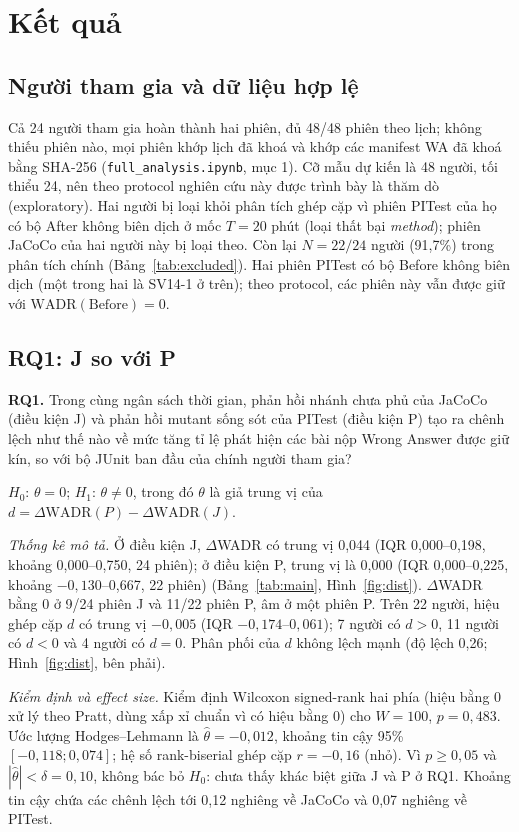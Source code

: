 \section{Kết quả}
\label{sec:results}

\subsection{Người tham gia và dữ liệu hợp lệ}
Cả 24 người tham gia hoàn thành hai phiên, đủ 48/48 phiên theo lịch; không thiếu phiên nào, mọi phiên khớp lịch đã khoá và khớp các manifest WA đã khoá bằng SHA-256 (\texttt{full\_analysis.ipynb}, mục 1).
Cỡ mẫu dự kiến là 48 người, tối thiểu 24, nên theo protocol nghiên cứu này được trình bày là thăm dò (exploratory).
Hai người bị loại khỏi phân tích ghép cặp vì phiên PITest của họ có bộ After không biên dịch ở mốc $T = 20$ phút (loại thất bại \textit{method}); phiên JaCoCo của hai người này bị loại theo.
Còn lại $N = 22/24$ người (91,7\%) trong phân tích chính (Bảng~\ref{tab:excluded}).
Hai phiên PITest có bộ Before không biên dịch (một trong hai là SV14-1 ở trên); theo protocol, các phiên này vẫn được giữ với $\mathrm{WADR(Before)} = 0$.

\subsection{RQ1: J so với P}
\textbf{RQ1.} Trong cùng ngân sách thời gian, phản hồi nhánh chưa phủ của JaCoCo (điều kiện J) và phản hồi mutant sống sót của PITest (điều kiện P) tạo ra chênh lệch như thế nào về mức tăng tỉ lệ phát hiện các bài nộp Wrong Answer được giữ kín, so với bộ JUnit ban đầu của chính người tham gia?

$H_0$: $\theta = 0$; $H_1$: $\theta \neq 0$, trong đó $\theta$ là giả trung vị của $d = \Delta\mathrm{WADR}(P) - \Delta\mathrm{WADR}(J)$.

\textit{Thống kê mô tả.}
Ở điều kiện J, $\Delta$WADR có trung vị 0,044 (IQR 0,000--0,198, khoảng 0,000--0,750, 24 phiên); ở điều kiện P, trung vị là 0,000 (IQR 0,000--0,225, khoảng $-0,130$--0,667, 22 phiên) (Bảng~\ref{tab:main}, Hình~\ref{fig:dist}).
$\Delta$WADR bằng 0 ở 9/24 phiên J và 11/22 phiên P, âm ở một phiên P.
Trên 22 người, hiệu ghép cặp $d$ có trung vị $-0,005$ (IQR $-0,174$--$0,061$); 7 người có $d > 0$, 11 người có $d < 0$ và 4 người có $d = 0$.
Phân phối của $d$ không lệch mạnh (độ lệch 0,26; Hình~\ref{fig:dist}, bên phải).

\textit{Kiểm định và effect size.}
Kiểm định Wilcoxon signed-rank hai phía (hiệu bằng 0 xử lý theo Pratt, dùng xấp xỉ chuẩn vì có hiệu bằng 0) cho $W = 100$, $p = 0,483$.
Ước lượng Hodges--Lehmann là $\hat{\theta} = -0,012$, khoảng tin cậy 95\% $[-0,118; 0,074]$; hệ số rank-biserial ghép cặp $r = -0,16$ (nhỏ).
Vì $p \geq 0,05$ và $|\hat{\theta}| < \delta = 0,10$, không bác bỏ $H_0$: chưa thấy khác biệt giữa J và P ở RQ1.
Khoảng tin cậy chứa các chênh lệch tới 0,12 nghiêng về JaCoCo và 0,07 nghiêng về PITest.

